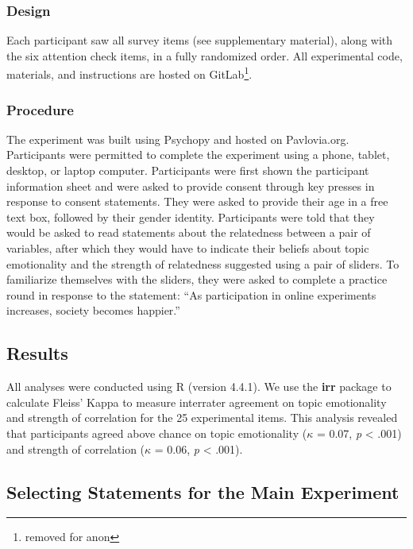\documentclass[manuscript,screen,review,anonymous]{acmart}
\begin{document}
\subsubsection{Design}\label{sec-design-pre}

Each participant saw all survey items (see supplementary material),
along with the six attention check items, in a fully randomized order.
All experimental code, materials, and instructions are hosted on
GitLab\footnote{removed for anon}.

\subsubsection{Procedure}\label{sec-procedure-pre}

The experiment was built using Psychopy \citep{pierce_2019} and hosted
on Pavlovia.org. Participants were permitted to complete the experiment
using a phone, tablet, desktop, or laptop computer. Participants were
first shown the participant information sheet and were asked to provide
consent through key presses in response to consent statements. They were
asked to provide their age in a free text box, followed by their gender
identity. Participants were told that they would be asked to read
statements about the relatedness between a pair of variables, after
which they would have to indicate their beliefs about topic emotionality
and the strength of relatedness suggested using a pair of sliders. To
familiarize themselves with the sliders, they were asked to complete a
practice round in response to the statement: ``As participation in
online experiments increases, society becomes happier.''

\subsection{Results}\label{sec-results-pre}

All analyses were conducted using R (version 4.4.1). We use the
\textbf{irr} package to calculate Fleiss' Kappa to measure interrater
agreement on topic emotionality and strength of correlation for the 25
experimental items. This analysis revealed that participants agreed
above chance on topic emotionality (\(\kappa\) = 0.07, \emph{p}
\textless{} .001) and strength of correlation (\(\kappa\) = 0.06,
\emph{p} \textless{} .001).

\subsection{Selecting Statements for the Main
Experiment}\label{sec-selecting-statements}
\end{document}
